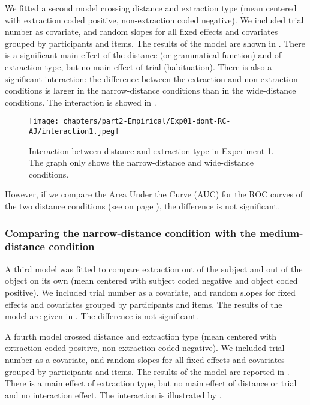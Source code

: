 We fitted a second model crossing distance and extraction type (mean centered with extraction coded positive, non-extraction coded negative). We included trial number as covariate, and random slopes for all fixed effects and covariates grouped by participants and items. The results of the model are shown in . 
There is a significant main effect of the distance (or grammatical function) and of extraction type, but no main effect of trial (habituation). There is also a significant interaction: the difference between the extraction and non-extraction conditions is larger in the narrow-distance conditions than in the wide-distance conditions. The interaction is showed in . 



\begin{figure}
    \centering
    \texttt{[image: chapters/part2-Empirical/Exp01-dont-RC-AJ/interaction1.jpeg]}
    \caption{Interaction between distance and extraction type in Experiment 1. The graph only shows the narrow-distance and wide-distance conditions.}
    \label{fig:exp01-interaction1}
\end{figure}

However, if we compare the Area Under the Curve (AUC) for the ROC curves of the two distance conditions (see  on page \pageref{fig:exp01-ROC}), the difference is not significant.

\subsubsection{Comparing the narrow-distance condition with the medium-distance condition}

A third model was fitted to compare extraction out of the subject and out of the object on its own (mean centered with subject coded negative and object coded positive). We included trial number as a covariate, and random slopes for fixed effects and covariates grouped by participants and items. The results of the model are given in . The difference is not significant.



A fourth model crossed distance and extraction type (mean centered with extraction coded positive, non-extraction coded negative). We included trial number as a covariate, and random slopes for all fixed effects and covariates grouped by participants and items. The results of the model are reported in . 
There is a main effect of extraction type, but no main effect of distance or trial and no interaction effect. The interaction is illustrated by . 

